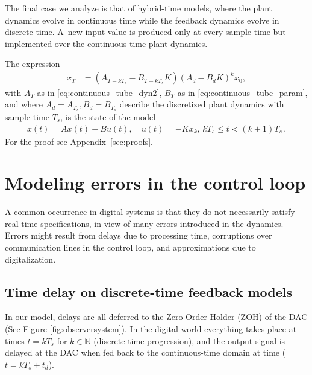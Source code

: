 \documentclass[sigconf]{llncs}
\newcommand{\mat}[1]{{#1}}
\renewcommand{\vec}[1]{{#1}}
\begin{document}
The final case we analyze is that of hybrid-time models, where the plant
dynamics evolve in continuous time while the feedback dynamics evolve in
discrete time.  A~new input value is produced only at every sample time but
implemented over the continuous-time plant dynamics.
%
\begin{theorem}
The expression
%
 \begin{align}
 \vec{x}_{T} &= (\mat{A}_{T-kT_s}-\mat{B}_{T-kT_s}\mat{K}) (\mat{A}_d-\mat{B}_d\mat{K})^k\vec{x}_0, 
 \label{eq:cyber_feedback}
 \end{align}
%
with $\mat{A}_T$ as in \eqref{eq:continuous_tube_dyn2}, $\mat{B}_T$ as in
\eqref{eq:continuous_tube_param}, and where $\mat{A}_d=\mat{A}_{T_s},
\mat{B}_d=\mat{B}_{T_s}$ describe the discretized plant dynamics with
sample time $T_s$, is the state of the model
%
\begin{align*}
 \dot{\vec{x}}(t) = \mat{A}\vec{x}(t)+\mat{B}\vec{u}(t), \quad 
 \vec{u}(t)=-\mat{K}\vec{x}_k,  \,
 kT_s \leq t < (k+1)T_s \,. 
\end{align*}
%
For the proof see Appendix~\ref{sec:proofs}.
%
\end{theorem}

\section{Modeling errors in the control loop}\label{sec:errors}

A common occurrence in digital systems is that they do not necessarily
satisfy real-time specifications, in view of many errors introduced in the
dynamics.  Errors might result from delays due to processing time,
corruptions over communication lines in the control loop, and approximations
due to digitalization.

\subsection{Time delay on discrete-time feedback models} \label{sec:delay}

In our model, delays are all deferred to the Zero Order Holder (ZOH) of the
DAC (See Figure \ref{fig:observersystem}).  In the digital world everything
takes place at times $t=kT_s$ for $k \in \mathbb{N}$ (discrete time
progression), and the output signal is delayed at the DAC when fed back to
the continuous-time domain at time ($t=kT_s+t_d$).
\end{document}
